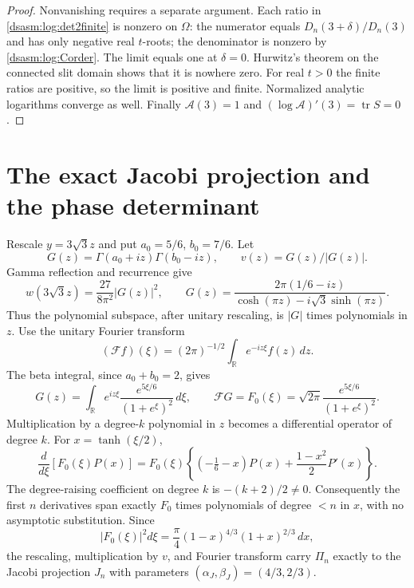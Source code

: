 \documentclass[11pt,letterpaper]{article}
\theoremstyle{remark}\newtheorem{remark}[theorem]{Remark}
\newcommand{\R}{\mathbb R}\newcommand{\C}{\mathbb C}\newcommand{\N}{\mathbb N}
\DeclareMathOperator{\tr}{tr}\DeclareMathOperator{\Ran}{Ran}
\begin{document}
\begin{proof}
Nonvanishing requires a separate argument. Each ratio in
\eqref{dsasm:log:det2finite} is nonzero on $\Omega$: the numerator equals
$D_n(3+\delta)/D_n(3)$ and has only negative real $t$-roots; the
denominator is nonzero by \eqref{dsasm:log:Corder}. The limit equals one
at $\delta=0$. Hurwitz's theorem on the connected slit domain
shows that it is nowhere zero. For real $t>0$ the finite ratios are
positive, so the limit is positive and finite. Normalized analytic
logarithms converge as well. Finally
$\mathcal A(3)=1$ and $(\log\mathcal A)'(3)=\tr S=0$.
\end{proof}

\section{The exact Jacobi projection and the phase determinant}
\label{dsasm:log:sec:jacobiconversion}
Rescale $y=3\sqrt3z$ and put $a_0=5/6$, $b_0=7/6$. Let
\[
 G(z)=\Gamma(a_0+iz)\Gamma(b_0-iz),\qquad v(z)=G(z)/|G(z)|.
\]
Gamma reflection and recurrence give
\begin{equation}\label{dsasm:log:Gexplicit}
 w(3\sqrt3z)=\frac{27}{8\pi^2}|G(z)|^2,\qquad
 G(z)=\frac{2\pi(1/6-iz)}{\cosh(\pi z)-i\sqrt3\sinh(\pi z)}.
\end{equation}
Thus the polynomial subspace, after unitary rescaling, is $|G|$
times polynomials in $z$. Use the unitary Fourier transform
\[
 (\mathcal Ff)(\xi)=(2\pi)^{-1/2}\int_{\R}e^{-iz\xi}f(z)\,dz.
\]
The beta integral, since $a_0+b_0=2$, gives
\[
 G(z)=\int_{\R} e^{iz\xi}\frac{e^{5\xi/6}}{(1+e^\xi)^2}\,d\xi,
 \qquad \mathcal FG=F_0(\xi)=\sqrt{2\pi}\frac{e^{5\xi/6}}{(1+e^\xi)^2}.
\]
Multiplication by a degree-$k$ polynomial in $z$ becomes a differential
operator of degree $k$. For $x=\tanh(\xi/2)$,
\begin{equation}\label{dsasm:log:derivspace}
 \frac{d}{d\xi}[F_0(\xi)P(x)]
 =F_0(\xi)\left\{(-\tfrac16-x)P(x)+\frac{1-x^2}{2}P'(x)\right\}.
\end{equation}
The degree-raising coefficient on degree $k$ is $-(k+2)/2\ne0$.
Consequently the first $n$ derivatives span exactly $F_0$ times
polynomials of degree $<n$ in $x$, with no asymptotic substitution.
Since
\begin{equation}\label{dsasm:log:Jacobiweight}
 |F_0(\xi)|^2d\xi=\frac\pi4(1-x)^{4/3}(1+x)^{2/3}\,dx,
\end{equation}
the rescaling, multiplication by $v$, and Fourier transform carry
$\Pi_n$ exactly to the Jacobi projection $J_n$ with parameters
$(\alpha_J,\beta_J)=(4/3,2/3)$.
\end{document}
